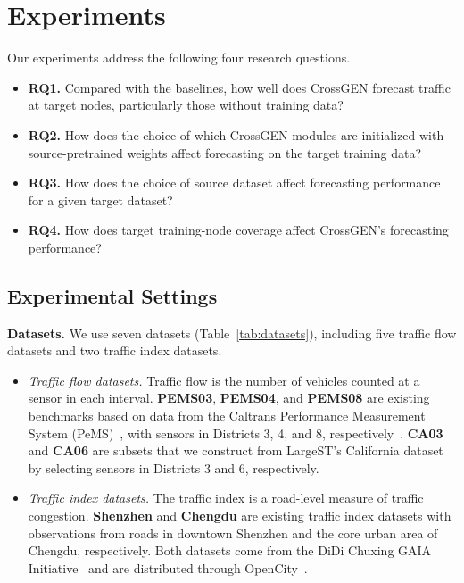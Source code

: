 \documentclass[runningheads,a4paper]{llncs}
\begin{document}
\section{Experiments}\label{sec:results}
\begin{samepage}
Our experiments address the following four research questions.
\begingroup
\DeclareRobustCommand{\revisedresearchquestions}{%
  \begin{itemize}
  \item \textbf{RQ1.} Compared with the baselines, how well does CrossGEN forecast traffic at target nodes, particularly those without training data?
  \item \textbf{RQ2.} How does the choice of which CrossGEN modules are initialized with source-pretrained weights affect forecasting on the target training data?
  \item \textbf{RQ3.} How does the choice of source dataset affect forecasting performance for a given target dataset?
  \item \textbf{RQ4.} How does target training-node coverage affect CrossGEN's forecasting performance?
  \end{itemize}%
}
\revisedresearchquestions
\endgroup
\end{samepage}

\subsection{Experimental Settings}
\label{sec:experimental-settings}


\noindent\textbf{Datasets.} We use seven datasets (Table~\ref{tab:datasets}), including five traffic flow datasets and two traffic index datasets.

\DeclareRobustCommand{\datasetvariablelist}{%
  \begin{itemize}
  \item \emph{Traffic flow datasets.} Traffic flow is the number of vehicles counted at a sensor in each interval. \textbf{PEMS03}, \textbf{PEMS04}, and \textbf{PEMS08} are existing benchmarks based on data from the Caltrans Performance Measurement System (PeMS)~\cite{pems}, with sensors in Districts 3, 4, and 8, respectively~\cite{stfit}. \textbf{CA03} and \textbf{CA06} are subsets that we construct from LargeST's California dataset~\cite{largest} by selecting sensors in Districts 3 and 6, respectively.
  \item \emph{Traffic index datasets.} The traffic index is a road-level measure of traffic congestion. \textbf{Shenzhen} and \textbf{Chengdu} are existing traffic index datasets with observations from roads in downtown Shenzhen and the core urban area of Chengdu, respectively. Both datasets come from the DiDi Chuxing GAIA Initiative~\cite{stgfsl} and are distributed through OpenCity~\cite{opencity}.
  \end{itemize}%
}
\datasetvariablelist
\end{document}
